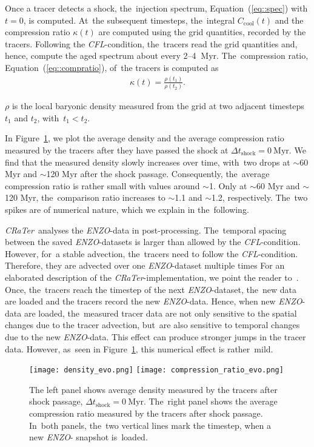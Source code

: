 \documentclass[galaxies,article,accept,moreauthors,pdftex]{mdpi}
\newcommand{\enzo}{{\it {\small ENZO}}}
\newcommand{\CRaTer}{{\it {\small CRaTer}}}
\newcommand{\Myr}{\mathrm{Myr}}
\newcommand{\Ccool}{C_{\mathrm{cool}}}
\begin{document}
Once a tracer detects a shock, the~injection spectrum, Equation~(\ref{eq::spec}) with $t = 0$, is computed. At~the subsequent timesteps, the~integral $\Ccool(t)$ and the compression ratio $\kappa(t)$ are computed using the grid quantities, recorded by the tracers. Following the \textit{CFL}-condition, the~tracers read the grid quantities and, hence, compute the aged spectrum about every 2--4 $\ \Myr$. The~compression ratio, Equation~(\ref{eq::compratio}), of~the tracers is computed as
\begin{align}
 \kappa(t) = \frac{\rho(t_1)}{\rho(t_2)}. \label{eq::kappa}
\end{align} 

$\rho$ is the local baryonic density measured from the grid at two adjacent timesteps $t_1$ and $t_2$, with~$t_1 < t_2$.

In Figure~\ref{fig::evo}, we plot the average density and the average compression ratio measured by the tracers after they have passed the shock at $\Delta t_{\mathrm{shock}} = 0 \ \Myr$. We find that the measured density slowly increases over time, with~two drops at $\sim$60 Myr and $\sim$120 Myr after the shock passage. Consequently, the~average compression ratio is rather small with values around $\sim$1. Only at  $\sim$60 Myr and $\sim$120 Myr, the~comparison ratio increases to $\sim$1.1 and $\sim$1.2, respectively. The~two spikes are of numerical nature, which we explain in the~following.

\CRaTer \ analyses the \enzo-data in post-processing. The~temporal spacing between the saved \enzo-datasets is larger than allowed by the \textit{CFL}-condition. However, for~a stable advection, the~tracers need to follow the \textit{CFL}-condition. Therefore, they are advected over one \enzo-dataset multiple times For an elaborated description of the \CRaTer-implementation, we point the reader to~\cite{myphdthesis}. Once, the~tracers reach the timestep of the next \enzo-dataset, the~new data are loaded and the tracers record the new \enzo-data. Hence, when new \enzo-data are loaded, the~measured tracer data are not only sensitive to the spatial changes due to the tracer advection, but~are also sensitive to temporal changes due to the new \enzo-data. This effect can produce stronger jumps in the tracer data. However, as~seen in Figure~\ref{fig::evo}, this numerical effect is rather~mild.




\begin{figure}[H]
 \texttt{[image: density\_evo.png]}
 \texttt{[image: compression\_ratio\_evo.png]}
 \caption{The left panel shows average density measured by the tracers after shock passage, $\Delta t_{\mathrm{shock}} = 0 \ \Myr$. The~right panel shows the average compression ratio measured by the tracers after shock passage. In~both panels, the~two vertical lines mark the timestep, when a new \enzo - snapshot is~loaded.}
 \label{fig::evo}
\end{figure}
\unskip
\end{document}
